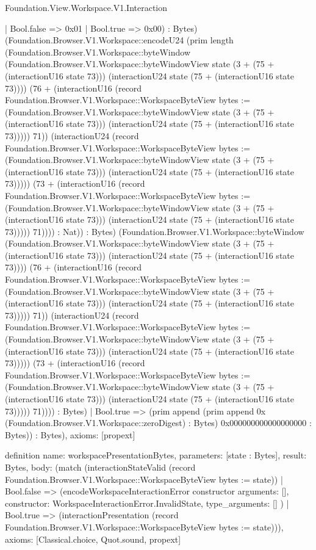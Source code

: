 \begin{lexlean}{Foundation.View.Workspace.V1.Interaction}
\begin{semanticmodule}
{      | Bool.false => 0x01
      | Bool.true => 0x00) : Bytes) (Foundation.Browser.V1.Workspace::encodeU24 (prim length (Foundation.Browser.V1.Workspace::byteWindow (Foundation.Browser.V1.Workspace::byteWindowView state (3 + (75 + (interactionU16 state 73))) (interactionU24 state (75 + (interactionU16 state 73)))) (76 + (interactionU16 (record Foundation.Browser.V1.Workspace::WorkspaceByteView {bytes := (Foundation.Browser.V1.Workspace::byteWindowView state (3 + (75 + (interactionU16 state 73))) (interactionU24 state (75 + (interactionU16 state 73))))}) 71)) (interactionU24 (record Foundation.Browser.V1.Workspace::WorkspaceByteView {bytes := (Foundation.Browser.V1.Workspace::byteWindowView state (3 + (75 + (interactionU16 state 73))) (interactionU24 state (75 + (interactionU16 state 73))))}) (73 + (interactionU16 (record Foundation.Browser.V1.Workspace::WorkspaceByteView {bytes := (Foundation.Browser.V1.Workspace::byteWindowView state (3 + (75 + (interactionU16 state 73))) (interactionU24 state (75 + (interactionU16 state 73))))}) 71)))) : Nat)) : Bytes) (Foundation.Browser.V1.Workspace::byteWindow (Foundation.Browser.V1.Workspace::byteWindowView state (3 + (75 + (interactionU16 state 73))) (interactionU24 state (75 + (interactionU16 state 73)))) (76 + (interactionU16 (record Foundation.Browser.V1.Workspace::WorkspaceByteView {bytes := (Foundation.Browser.V1.Workspace::byteWindowView state (3 + (75 + (interactionU16 state 73))) (interactionU24 state (75 + (interactionU16 state 73))))}) 71)) (interactionU24 (record Foundation.Browser.V1.Workspace::WorkspaceByteView {bytes := (Foundation.Browser.V1.Workspace::byteWindowView state (3 + (75 + (interactionU16 state 73))) (interactionU24 state (75 + (interactionU16 state 73))))}) (73 + (interactionU16 (record Foundation.Browser.V1.Workspace::WorkspaceByteView {bytes := (Foundation.Browser.V1.Workspace::byteWindowView state (3 + (75 + (interactionU16 state 73))) (interactionU24 state (75 + (interactionU16 state 73))))}) 71)))) : Bytes)
    | Bool.true => (prim append (prim append 0x (Foundation.Browser.V1.Workspace::zeroDigest) : Bytes) 0x000000000000000000 : Bytes)) : Bytes),
  axioms: [propext]
}

definition{
  name: workspacePresentationBytes,
  parameters: [state : Bytes],
  result: Bytes,
  body: (match (interactionStateValid (record Foundation.Browser.V1.Workspace::WorkspaceByteView {bytes := state}))
    | Bool.false => (encodeWorkspaceInteractionError constructor{
      arguments: [],
      constructor: WorkspaceInteractionError.InvalidState,
      type_arguments: []
    })
    | Bool.true => (interactionPresentation (record Foundation.Browser.V1.Workspace::WorkspaceByteView {bytes := state}))),
  axioms: [Classical.choice, Quot.sound, propext]
}


\end{semanticmodule}
\end{lexlean}
